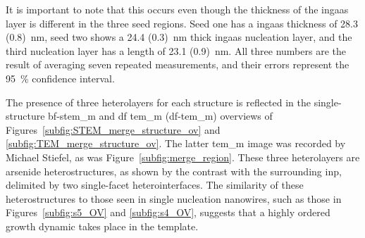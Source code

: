 It is important to note that this occurs even though the thickness of the \acs{ingaas} layer is different in the three seed regions. Seed one has a \acs{ingaas} thickness of \qty[separate-uncertainty=true]{28.3 (0.8)}{\nano\metre}, seed two shows a \qty[separate-uncertainty=true]{24.4 (0.3)}{\nano\metre} thick \acs{ingaas} nucleation layer, and the third nucleation layer has a length of \qty[separate-uncertainty=true]{23.1 (0.9)}{\nano\metre}. All three numbers are the result of averaging seven repeated measurements, and their errors represent the \qty{95}{\%} confidence interval. 

The presence of three heterolayers for each structure is reflected in the single-structure \acs{bf}-\acs{stem_m} and \acl{df} \acl{tem_m} (\acs{df}-\acs{tem_m}) overviews of Figures~\ref{subfig:STEM_merge_structure_ov} and \ref{subfig:TEM_merge_structure_ov}. The latter \acs{tem_m} image was recorded by Michael Stiefel, as was Figure~\ref{subfig:merge_region}. These three heterolayers are arsenide heterostructures, as shown by the contrast with the surrounding \acs{inp}, delimited by two single-facet  heterointerfaces. The similarity of these heterostructures to those seen in single nucleation nanowires, such as those in Figures~\ref{subfig:s5_OV} and \ref{subfig:s4_OV}, suggests that a highly ordered growth dynamic takes place in the template.

